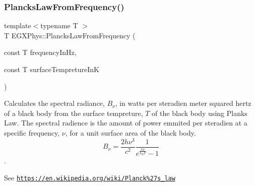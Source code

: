 \subsubsection{\texorpdfstring{Plancks\+Law\+From\+Frequency()}{PlancksLawFromFrequency()}}
{\footnotesize\ttfamily template$<$typename T $>$ \\
T E\+G\+X\+Phys\+::\+Plancks\+Law\+From\+Frequency (\begin{DoxyParamCaption}\item[{const T}]{frequency\+In\+Hz,  }\item[{const T}]{surface\+Tempreture\+InK }\end{DoxyParamCaption})}



Calculates the spectral radiance, $B_{\nu}$, in watts per steradien meter squared hertz of a black body from the surface tempreture, $T$ of the black body using Plank\textquotesingle{}s Law. The spectral radience is the amount of power emmited per steradien at a specific frequency, $\nu$, for a unit surface area of the black body. \[ B_{\nu} = \dfrac{2 h \nu^3}{c^2} \dfrac{1}{e^{\frac{h\nu}{k_B T}} - 1} \]. 

See \href{https://en.wikipedia.org/wiki/Planck%27s_law}{\tt https\+://en.\+wikipedia.\+org/wiki/\+Planck\%27s\+\_\+law}



